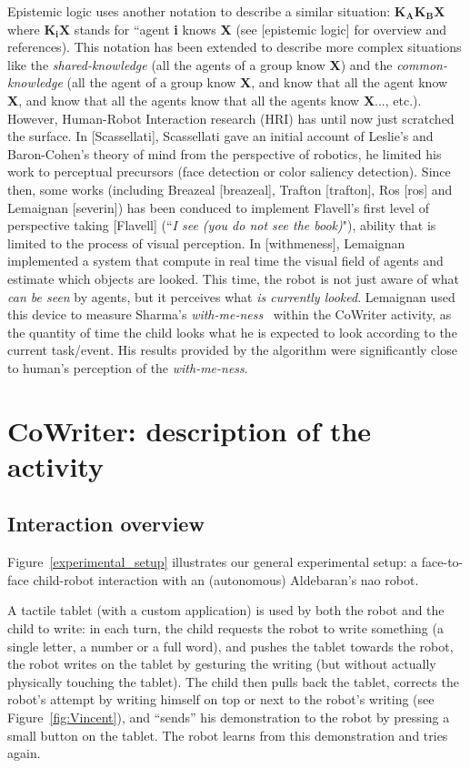 \documentclass[10pt,a4paper,twocolumn]{article}
\begin{document}
Epistemic logic uses another notation to describe a similar situation: $\textbf{K}_{\textbf{A}}\textbf{K}_{\textbf{B}}\textbf{X}$ where $\textbf{K}_{\textbf{i}}\textbf{X}$ stands for ``agent \textbf{i} knows \textbf{X} (see [epistemic logic] for overview and references). This notation has been extended to describe more complex situations like the \textit{shared-knowledge} (all the agents of a group know \textbf{X}) and the \textit{common-knowledge} (all the agent of a group know \textbf{X}, and know that all the agent know \textbf{X}, and know that all the agents know that all the agents know \textbf{X}..., etc.). 
However, Human-Robot Interaction research (HRI) has until now just scratched the surface. In [Scassellati], Scassellati gave an initial account of Leslie's and Baron-Cohen's theory of mind from the perspective of robotics, he limited his work to perceptual precursors (face detection or color saliency detection). Since then, some works (including Breazeal [breazeal], Trafton [trafton], Ros [ros] and Lemaignan [severin]) has been conduced to implement Flavell's first level of perspective taking [Flavell] (``\textit{I see (you do not see the book)}"), ability that is limited to the process of visual perception.
In [withmeness], Lemaignan implemented a system that compute in real time the visual field of agents and estimate which objects are looked. This time, the robot is not just aware of what \textit{can be seen} by agents, but it perceives what \textit{is currently looked}. Lemaignan used this device to measure Sharma's \textit{with-me-ness}~\cite{sharma2014me} within the CoWriter activity, as the quantity of time the child looks what he is expected to look according to the current task/event. His results provided by the algorithm were significantly close to human's perception of the \textit{with-me-ness}.


\section{CoWriter: description of the activity}
\subsection{Interaction overview}
Figure~\ref{experimental_setup} illustrates our general experimental setup: a
face-to-face child-robot interaction with an (autonomous) Aldebaran's {\sc nao}
robot.

A tactile tablet (with a custom application) is used by both the robot and the
child to write: in each turn, the child requests the robot to write
something (a single letter, a number or a full word), and pushes the tablet
towards the robot, the robot writes on the tablet by gesturing the writing (but
without actually physically touching the tablet). The child then pulls back the
tablet, corrects the robot's attempt by writing himself on top or next to
the robot's writing (see Figure~\ref{fig:Vincent}), and ``sends'' his
demonstration to the robot by pressing a small button on the tablet. The robot
learns from this demonstration and tries again.
\end{document}
